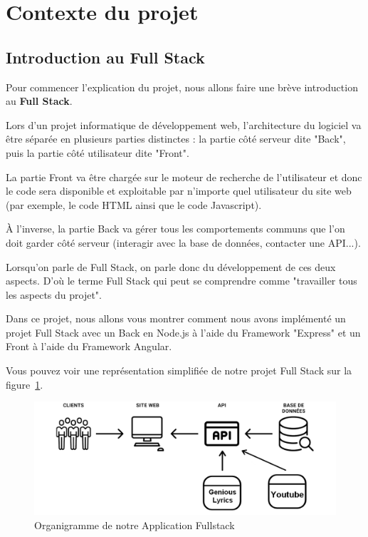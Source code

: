 \documentclass[12pt,french]{article}
\begin{document}
\newpage

\section{Contexte du projet}

\subsection{Introduction au Full Stack}

Pour commencer l'explication du projet, nous allons faire une brève introduction au \textbf{Full Stack}.

\medskip

Lors d'un projet informatique de développement web, l'architecture du logiciel va être séparée en plusieurs parties distinctes : la partie côté serveur dite "\gls{Back}", puis la partie côté utilisateur dite "\gls{Front}".

\medskip

La partie \gls{Front} va être chargée sur le moteur de recherche de l'utilisateur et donc le code sera disponible et exploitable par n'importe quel utilisateur du site web (par exemple, le code \gls{HTML} ainsi que le code \gls{Javascript}).

\medskip

À l'inverse, la partie \gls{Back} va gérer tous les comportements communs que l'on doit garder côté serveur (interagir avec la base de données, contacter une \gls{API}...).

\medskip

Lorsqu'on parle de Full Stack, on parle donc du développement de ces deux aspects. D'où le terme Full Stack qui peut se comprendre comme "travailler tous les aspects du projet".

\medskip

Dans ce projet, nous allons vous montrer comment nous avons implémenté un projet Full Stack avec un \gls{Back} en Node.js à l'aide du \gls{Framework} "Express" et un \gls{Front} à l'aide du \gls{Framework} Angular.

\medskip

Vous pouvez voir une représentation simplifiée de notre projet Full Stack sur la figure~\ref{figure1}.

\begin{figure}[H]
	\centering
	\includegraphics[scale=0.4]{fullstack.png}
	\caption{Organigramme de notre Application Fullstack}  
	\label{figure1}  
\end{figure}
\end{document}
